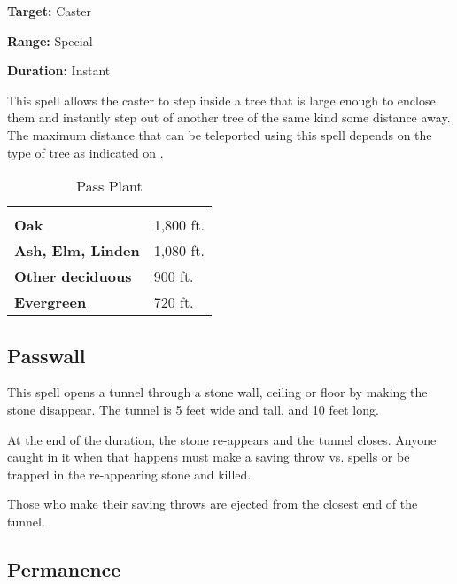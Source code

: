 \begin{multicols*}{2}
{\textbf{Target:} Caster

\textbf{Range:} Special

\textbf{Duration:} Instant}

This spell allows the caster to step inside a tree that is large enough to enclose them and instantly step out of another tree of the same kind some distance away. The maximum distance that can be teleported using this spell depends on the type of tree as indicated on .

\begin {table}[H]
\caption{Pass Plant}\label{tab:Pass Plant}
  \begin{tabularx}{\columnwidth}{>{\bfseries}YY}
	 & \\
	Oak & 1,800 ft.\\
	Ash, Elm, Linden & 1,080 ft.\\
	Other deciduous & 900 ft.\\
	Evergreen & 720 ft.
  \end {tabularx}
\end {table}

\subsection{Passwall}\label{spell:Passwall}

This spell opens a tunnel through a stone wall, ceiling or floor by making the stone disappear. The tunnel is 5 feet wide and tall, and 10 feet long.

At the end of the duration, the stone re-appears and the tunnel closes. Anyone caught in it when that happens must make a saving throw vs. spells or be trapped in the re-appearing stone and killed.

Those who make their saving throws are ejected from the closest end of the tunnel.

\subsection{Permanence}\label{spell:Permanence}
\end{multicols*}
